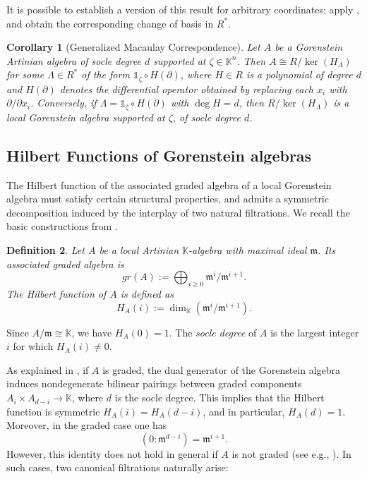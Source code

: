 \documentclass[a4paper,11p]{amsart}
\newtheorem{defn0}{Definition}[section]
\newtheorem{corollary0}[defn0]{Corollary}
\newenvironment{definition}{ \begin{defn0}}{\end{defn0}}
\newenvironment{corollary}{\bigskip \begin{corollary0}}{\end{corollary0}}
\newcommand{\K}{\mathbb K}
\begin{document}
It is possible to establish a version of this result for arbitrary coordinates: apply  ,  and obtain the corresponding change of basis in $R^*$.

\begin{corollary}[Generalized Macaulay Correspondence]\label{Thm: GeneralisedMacaulayCorrespondence}
    Let $A$ be a Gorenstein Artinian algebra of socle degree $d$ supported at $\zeta \in \K^n$. Then $A \cong R / \ker(H_\Lambda)$ for some $\Lambda \in R^*$ of the form $\mathds{1}_\zeta \circ H(\partial)$, where $H \in R$ is a polynomial of degree $d$ and $H(\partial)$ denotes the differential operator obtained by replacing each $x_i$ with $\partial / \partial x_i$. Conversely, if $\Lambda = \mathds{1}_\zeta \circ H(\partial)$ with $\deg H = d$, then $R / \ker(H_\Lambda)$ is a local Gorenstein algebra supported at $\zeta$, of socle degree $d$.
\end{corollary}

\subsection{Hilbert Functions of Gorenstein algebras}

The Hilbert function of the associated graded algebra of a local Gorenstein algebra must satisfy certain structural properties, and admits a symmetric decomposition induced by the interplay of two natural filtrations. We recall the basic constructions from \cite{Iarrobino}.

\begin{definition}
    Let $A$ be a local Artinian $\K$-algebra with maximal ideal $\mathfrak{m}$. Its \emph{associated graded algebra} is
    \[
    gr(A) := \bigoplus_{i \geq 0} \mathfrak{m}^{i} / \mathfrak{m}^{i+1}.
    \]
    The \emph{Hilbert function} of $A$ is defined as
    \[
    H_A(i) := \dim_{\K} \left( \mathfrak{m}^{i} / \mathfrak{m}^{i+1} \right).
    \]
\end{definition}

Since $A / \mathfrak{m} \cong \K$, we have $H_A(0) = 1$. The \emph{socle degree} of $A$ is the largest integer $i$ for which $H_A(i) \neq 0$.


As explained in \cite{Iarrobino}, if $A$ is graded, the dual generator of the Gorenstein algebra induces nondegenerate bilinear pairings between graded components $
A_i \times A_{d-i} \to \K$,
where $d$ is the socle degree. This implies that the Hilbert function is symmetric 
$H_A(i) = H_A(d - i)$, 
and in particular, $H_A(d) = 1$. Moreover, in the graded case one has
\[
(0 : \mathfrak{m}^{d - i}) = \mathfrak{m}^{i + 1}.
\]
However, this identity does not hold in general if $A$ is not graded (see e.g., \cite[Example 3.28]{Joachim}). In such cases, two canonical filtrations naturally arise:
\end{document}
